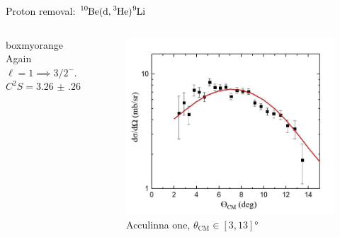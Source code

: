 \documentclass[sans,
frameno, %
mp,
usenames,dvipsnames, %
onlytextwidth, %
t,%
11pt]{beamer}
\newcommand{\iso}[2]{\ce{^{#1}#2}}
\begin{document}
\begin{frame}{Proton removal: $\iso{10}{Be}(\textrm{d}, \iso{3}{He})\iso{9}{Li}$}
\begin{columns}[t]
{            \medskip
            \hfill
            \begin{beamercolorbox}[sep=1ex,center, rounded=true, wd=0.95\linewidth]{boxmyorange}
                Again $\ell = 1 \implies 3/2^{-}$. \\
                $C^2S = \qty{3.26(26)}{}$
            \end{beamercolorbox}
            \hfill
        }
        \hfill
        {
            {
                \begin{figure}
                    \centering
                    \captionsetup{belowskip=3.5pt}
                    \caption{Acculinna one, $\theta_{\textrm{CM}} \in \left[3, 13\right]\unit{\degree}$}
                    \includegraphics[width=0.8\linewidth, cfbox=Mulberry 1pt 0pt 0pt]{figures/acculina_xs.png}%
                \end{figure}

}}
\end{columns}
\end{frame}
\end{document}
